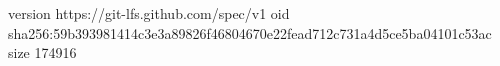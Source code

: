version https://git-lfs.github.com/spec/v1
oid sha256:59b393981414c3e3a89826f46804670e22fead712c731a4d5ce5ba04101c53ac
size 174916
